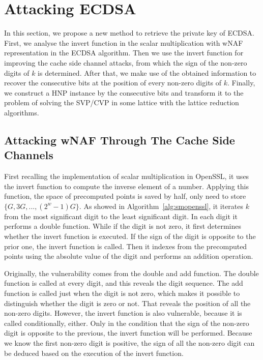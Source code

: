 \section{Attacking ECDSA}
\label{sec:attack}
In this section, we propose a new method to retrieve the private key of ECDSA.
First, we analyse the invert function in the scalar multiplication with wNAF representation in the ECDSA algorithm.
 Then we use the invert function for improving the cache side channel attacks, from which the sign of the non-zero digits of $k$ is determined.
After that, we make use of the obtained information to recover the consecutive bits at the position of every non-zero digits of $k$.
Finally, we construct a HNP instance by the consecutive bits and transform it to the problem of solving the SVP/CVP in some lattice with the lattice reduction algorithms.

\subsection{Attacking wNAF Through The Cache Side Channels}
\label{data_get}
First recalling the implementation of scalar multiplication in OpenSSL, it uses the invert function to
  compute the inverse element of a number.
Applying this function, the space of precomputed points is saved by half, only need to store $\{G, 3G, ..., (2^{w} - 1)G\}$.
As showed in Algorithm~\ref{alg:smopenssl},
it iterates $k$ from the most significant digit to the least significant digit.
In each digit it performs a double function.
While if the digit is not zero, it first determines whether the invert function is executed.
 If the sign of the digit is opposite to the prior one, the invert function is called.
Then it indexes from the precomputed points using the absolute value of the digit and performs an addition operation.

Originally, the vulnerability comes from the double and add function.
The double function is called at every digit, and this reveals the digit sequence.
The add function is called just when the digit is not zero,
  which makes it possible to distinguish whether the digit is zero or not.
  That reveals the position of all the non-zero digits.
However,
 the invert function is also vulnerable, because it is called conditionally, either.
Only in the condition that the sign of the non-zero digit is opposite to the previous, the invert function will be performed.
Because we know the first non-zero digit is positive,
   the sign of all the non-zero digit can be deduced based on the execution of the invert function.


